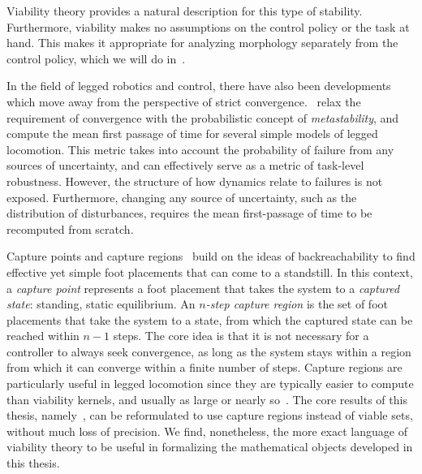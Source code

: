 Viability theory provides a natural description for this type of stability. Furthermore, viability makes no assumptions on the control policy or the task at hand. This makes it appropriate for analyzing morphology separately from the control policy, which we will do in~\cite{heim2019beyond}. \par

In the field of legged robotics and control, there have also been developments which move away from the perspective of strict convergence.~\textcite{byl2009metastable} relax the requirement of convergence with the probabilistic concept of \emph{metastability}, and compute the mean first passage of time for several simple models of legged locomotion. This metric takes into account the probability of failure from any sources of uncertainty, and can effectively serve as a metric of task-level robustness.
However, the structure of how dynamics relate to failures is not exposed. Furthermore, changing any source of uncertainty, such as the distribution of disturbances, requires the mean first-passage of time to be recomputed from scratch. \par

Capture points and capture regions~\cite{koolen2012capturability} build on the ideas of backreachability to find effective yet simple foot placements that can come to a standstill. In this context, a \emph{capture point} represents a foot placement that takes the system to a \emph{captured state}: standing, static equilibrium. An \emph{$n$-step capture region} is the set of foot placements that take the system to a state, from which the captured state can be reached within $n-1$ steps.
The core idea is that it is not necessary for a controller to always seek convergence, as long as the system stays within a region from which it can converge within a finite number of steps.
Capture regions are particularly useful in legged locomotion since they are typically easier to compute than viability kernels, and usually as large or nearly so~\cite{koolen2012capturability,zaytsev2018boundaries}. The core results of this thesis, namely~\cite{heim2019beyond,heim2019learnable}, can be reformulated to use capture regions instead of viable sets, without much loss of precision. We find, nonetheless, the more exact language of viability theory to be useful in formalizing the mathematical objects developed in this thesis. \par

